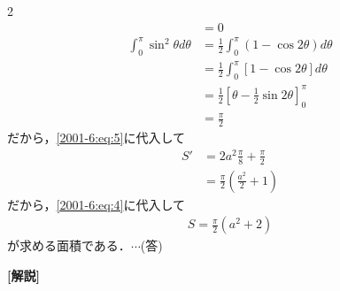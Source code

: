 \documentclass[../../../../main.tex]{subfiles}
\begin{document}
\begin{multicols}{2}
\begin{align*}
     & = 0                                                                    \\
    \int_{0}^{\pi}\sin^2\theta d\theta
     & =    \frac{1}{2} \int_{0}^{\pi}\left(1-\cos 2\theta\right) d\theta     \\
     & =    \frac{1}{2} \int_{0}^{\pi}\left[1-\cos 2\theta\right] d\theta     \\
     & =    \frac{1}{2} \left[\theta-\frac{1}{2}\sin 2\theta\right]_{0}^{\pi} \\
     & =    \frac{\pi}{2}
  \end{align*}
  だから，\cref{2001-6:eq:5}に代入して
  \begin{align*}
    S'
     & = 2a^2\frac{\pi}{8} + \frac{\pi}{2}         \\
     & = \frac{\pi}{2}\left(\frac{a^2}{2}+1\right)
  \end{align*}
  だから，\cref{2001-6:eq:4}に代入して
  \begin{align*}
    S = \frac{\pi}{2}\left(a^2+2\right)
  \end{align*}
  が求める面積である．$\cdots$(答)

  \vspace{10pt}
  {\bf[解説]}
  \newpage
\end{multicols}
\end{document}
